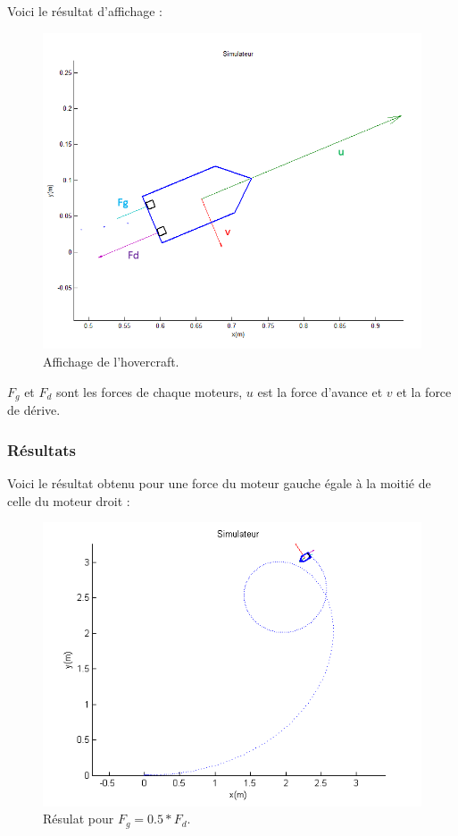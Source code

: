 \documentclass[a4paper,10pt]{article}
\begin{document}
Voici le résultat d’affichage :

\begin{figure}[H]
\bigcenter\includegraphics[scale=0.5]{images/plothover.png}
\caption{Affichage de l'hovercraft.}
\end{figure}

$F_g$ et $F_d$ sont les forces de chaque moteurs, $u$ est la force d’avance et $v$ et la force de dérive.

\subsubsection{Résultats}
Voici le résultat obtenu pour une force du moteur gauche égale à la moitié de celle du moteur droit :

\begin{figure}[H]
\bigcenter\includegraphics[scale=0.8]{images/simulateur_sortie.png}
\caption{Résulat pour $F_g = 0.5*F_d$.}
\end{figure}
\end{document}
